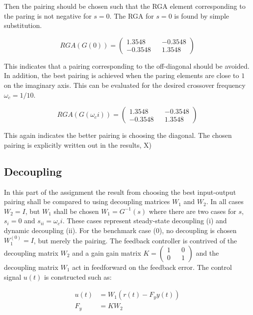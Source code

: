 \documentclass[a4paper, titlepage]{article}
\begin{document}
Then the pairing should be chosen such that the RGA element corresponding to the paring is not negative for $s=0$.
The RGA for $s=0$ is found by simple substitution.

\begin{equation}
RGA(G(0)) = 
\begin{pmatrix}
1.3548 && -0.3548 \\
-0.3548 && 1.3548
\end{pmatrix}
\end{equation}

This indicates that a pairing corresponding to the off-diagonal should be avoided.
In addition, the best pairing is achieved when the paring elements are close to $1$ on the imaginary axis.
This can be evaluated for the desired crossover frequency $\omega_c = 1/10$.

\begin{equation}
RGA(G(\omega_ci)) = 
\begin{pmatrix}
1.3548 && -0.3548 \\
-0.3548 && 1.3548
\end{pmatrix}
\end{equation}

This again indicates the better pairing is choosing the diagonal.
The chosen pairing is explicitly written out in the results, X)

\subsection{Decoupling}
In this part of the assignment the result from choosing the best input-output pairing shall be compared to using decoupling matrices $W_1$ and $W_2$.
In all cases $W_2 = I$, but $W_1$ shall be chosen $W_1 = G^{-1}(s)$ where there are two cases for $s$, $s_i = 0$ and $s_{ii}=\omega_ci$.
These cases represent steady-state decoupling (i) and dynamic decoupling (ii).
For the benchmark case (0), no decoupling is chosen $W^{(0)}_1 = I$, but merely the pairing.
The feedback controller is contrived of the decoupling matrix $W_2$ and a gain gain matrix $K = \begin{pmatrix} 1 && 0 \\ 0 && 1 \end{pmatrix}$ and the decoupling matrix $W_1$ act in feedforward on the feedback error.
The control signal $u(t)$ is constructed such as:

\begin{equation}
\begin{split}
u(t) &= W_1(r(t) - F_yy(t)) \\
F_y &= KW_2
\end{split}
\label{equ:fbControl}
\end{equation}
\end{document}
